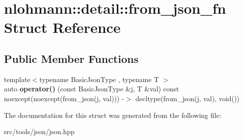 \hypertarget{structnlohmann_1_1detail_1_1from__json__fn}{}\section{nlohmann\+:\+:detail\+:\+:from\+\_\+json\+\_\+fn Struct Reference}
\label{structnlohmann_1_1detail_1_1from__json__fn}
\subsection*{Public Member Functions}
\begin{DoxyCompactItemize}
\item 
\mbox{\label{structnlohmann_1_1detail_1_1from__json__fn_a6d14a74e1043072c77892534572d2973}} 
{\footnotesize template$<$typename Basic\+Json\+Type , typename T $>$ }\\auto {\bfseries operator()} (const Basic\+Json\+Type \&j, T \&val) const noexcept(noexcept(from\+\_\+json(j, val))) -\/$>$ decltype(from\+\_\+json(j, val), void())
\end{DoxyCompactItemize}


The documentation for this struct was generated from the following file\+:\begin{DoxyCompactItemize}
\item 
src/tools/json/json.\+hpp\end{DoxyCompactItemize}
